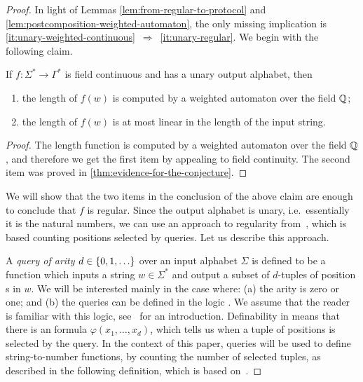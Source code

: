 \begin{proof}
In light of Lemmas \ref{lem:from-regular-to-protocol} and \ref{lem:postcomposition-weighted-automaton},  the only missing implication is \ref{it:unary-weighted-continuous}~$\Rightarrow$~\ref{it:unary-regular}.  We begin with the following claim. 

\begin{claim}\label{claim:unary-output-alphabet-basic-consequences}
    If $f :\Sigma^* \to \Gamma^*$ is field continuous and has a unary output alphabet, then 
        \begin{enumerate}
        \item \label{it:unary-computed-by-weighted} the length of $f(w)$ is  computed by a weighted automaton over the field ${\mathbb Q}$;
        \item \label{it:unary-linear-output-size} the length of $f(w)$ is  at most linear in the length of the input string.
    \end{enumerate}
\end{claim}
\begin{proof}
    The length function is computed by a weighted automaton over the field ${\mathbb Q}$, and therefore we get the first item by appealing to field continuity. The second item was proved in \cref{thm:evidence-for-the-conjecture}.
\end{proof}

We will show that the two items in the conclusion of the above claim are  enough to conclude that $f$ is  regular. Since the output alphabet is unary, i.e.~essentially it is the natural numbers, we can use an approach to regularity from~\cite{Zpolyreg23}, which is based counting positions selected by queries. Let us describe this approach.

A \emph{query of arity $d \in \{0,1,\ldots\}$} 
over an input alphabet $\Sigma$ is defined to be a function which inputs a string  $w \in \Sigma^*$ and output a subset of $d$-tuples of position   s in $w$.
 We will be interested mainly in the case where: (a) the arity is zero or one; and (b) the queries  can be defined in the logic \mso.  We assume that the reader is familiar with this logic, see~\cite[Section 2.1]{bojanczyk_recobook} for an introduction. 
Definability in \mso means that there is an \mso formula $\varphi(x_1,\ldots,x_d)$, which tells us when a tuple of positions is selected by the query. 
In the context of this paper, queries will be used to define string-to-number functions, by counting the number of selected tuples, as described in the  following definition, which is based on~\cite{Zpolyreg23}.



\end{proof}
